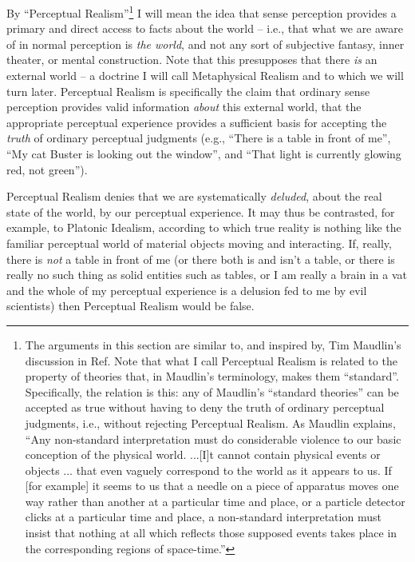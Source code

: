 \documentclass[12pt]{article}
\begin{document}
By ``Perceptual Realism''\footnote{The 
  arguments in this section are similar to, and inspired
  by, Tim Maudlin's discussion in Ref. \cite{maudlin}  
  Note that what I call Perceptual Realism is related to the
  property of theories that, in Maudlin's terminology, makes them
  ``standard''.  Specifically, the relation is this:  any of Maudlin's
  ``standard theories'' can be accepted as true without having to deny
  the truth of ordinary perceptual judgments, i.e., without rejecting
  Perceptual Realism.  As Maudlin explains, ``Any non-standard
  interpretation must do considerable violence to our basic conception
  of the physical world.  ...[I]t cannot contain physical events or
  objects ... that even vaguely correspond to the world as it appears
  to us.  If [for example] it seems to us that a needle on a piece of
  apparatus moves one way rather than another at a particular time and
  place, or a particle detector clicks at a particular time and place,
  a non-standard interpretation must insist that nothing at all which
  reflects those supposed events takes place in the corresponding
  regions of space-time.''}
I will mean the idea that sense perception
provides a primary and direct access to facts about the world -- i.e.,
that
what we are aware of in normal perception is \emph{the world}, and not
any sort of subjective fantasy, inner theater, or mental construction.  
\cite{kelley}  Note
that this presupposes that there \emph{is} an external world -- a
doctrine I will call Metaphysical Realism and to which we will turn
later.  Perceptual Realism is specifically the claim that ordinary
sense perception provides valid information \emph{about} this 
external world, that
the appropriate perceptual experience provides a sufficient basis for
accepting the \emph{truth} of ordinary perceptual judgments (e.g., 
``There is a table in front of me'', ``My cat Buster is looking out 
the window'', and ``That light is currently glowing red, not
green'').  


Perceptual Realism denies that we are
systematically \emph{deluded}, about the real state of the world, by 
our perceptual experience.  It may thus be contrasted, for example, to
Platonic Idealism, according to which true reality is 
nothing like the familiar perceptual world of material objects moving
and interacting.  If, really, there is \emph{not} a table in front of
me (or there both is and isn't a table, or there is really no such
thing as solid entities such as tables, or I am really a brain in a
vat and the whole of my perceptual experience is a delusion fed to me
by evil scientists) then Perceptual Realism would be false.
\end{document}
